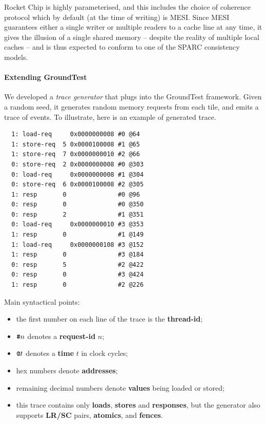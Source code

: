 \documentclass[11pt]{article}
\begin{document}
Rocket Chip is highly parameterised, and this includes the choice of
coherence protocol which by default (at the time of writing) is MESI.
Since MESI guarantees either a single writer or multiple readers to a
cache line at any time, it gives the illusion of a single shared
memory -- despite the reality of multiple local caches -- and is thus
expected to conform to one of the SPARC consistency models.

\paragraph{Extending GroundTest}

We developed a \emph{trace generator} that plugs into the
GroundTest framework.  Given a random seed, it generates random
memory requests from each tile, and emits a trace of events.  To
illustrate, here is an example of generated trace.

\begin{verbatim}
  1: load-req     0x0000000008 #0 @64
  1: store-req  5 0x0000100008 #1 @65
  1: store-req  7 0x0000000010 #2 @66
  0: store-req  2 0x0000000008 #0 @303
  0: load-req     0x0000000008 #1 @304
  0: store-req  6 0x0000100008 #2 @305
  1: resp       0              #0 @96
  0: resp       0              #0 @350
  0: resp       2              #1 @351
  0: load-req     0x0000000010 #3 @353
  1: resp       0              #1 @149
  1: load-req     0x0000000108 #3 @152
  1: resp       0              #3 @184
  0: resp       5              #2 @422
  0: resp       0              #3 @424
  1: resp       0              #2 @226
\end{verbatim}

\noindent Main syntactical points:

\begin{itemize}

\item the first number on each line of the trace is the
\textbf{thread-id};

\item $\verb!#!n$ denotes a \textbf{request-id} $n$;

\item $\verb!@!t$ denotes a \textbf{time} $t$ in clock cycles;

\item hex numbers denote \textbf{addresses};

\item remaining decimal numbers denote \textbf{values} being loaded or stored;

\item this trace contains only \textbf{loads}, \textbf{stores} and
\textbf{responses}, but the generator also supports \textbf{LR/SC}
pairs, \textbf{atomics}, and \textbf{fences}.

\end{itemize}
\end{document}
